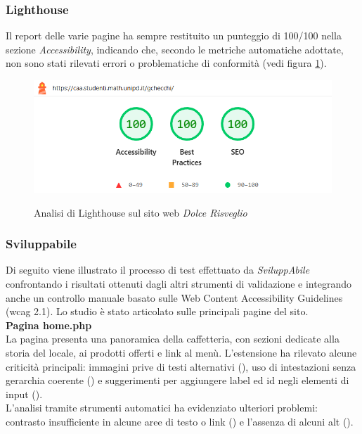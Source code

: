 \subsubsection{Lighthouse}
\noindent Il report delle varie pagine ha sempre restituito un punteggio di 100/100 nella sezione \textit{Accessibility}, indicando che, secondo le metriche automatiche adottate, non sono stati rilevati errori o problematiche di conformità (vedi figura \ref{fig:Lighthouse_dolcerisveglio}).
\begin{figure}[H]
    \centering
    \includegraphics[width=0.6\linewidth, alt={Screenshot dell'analisi di Lighthouse sul sito web DolceRisveglio}]{img/Lighthouse_dolcerisveglio.png}
    \caption{Analisi di Lighthouse sul sito web \textit{Dolce Risveglio}}\label{fig:Lighthouse_dolcerisveglio}
\end{figure}

\subsubsection{Sviluppabile}
\noindent Di seguito viene illustrato il processo di test effettuato da \textit{SviluppAbile} confrontando i risultati ottenuti dagli altri strumenti di validazione e integrando anche un controllo manuale basato sulle Web Content Accessibility Guidelines (\acrshort{wcag} 2.1). Lo studio è stato articolato sulle principali pagine del sito.\\

\noindent \textbf{Pagina home.php}\\
La pagina presenta una panoramica della caffetteria, con sezioni dedicate alla storia del locale, ai prodotti offerti e link al menù. L’estensione ha rilevato alcune criticità principali: immagini prive di testi alternativi ({}), uso di intestazioni senza gerarchia coerente ({}) e suggerimenti per aggiungere label ed id negli elementi di input ({}).\\
L’analisi tramite strumenti automatici ha evidenziato ulteriori problemi: contrasto insufficiente in alcune aree di testo o link ({}) e l'assenza di alcuni alt ({}).\\

